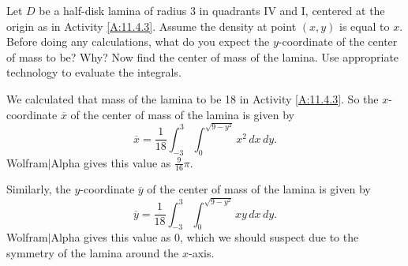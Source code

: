 \begin{activity} \label{A:11.4.5} Let $D$ be a half-disk lamina of radius 3 in quadrants IV and I, centered at the origin as in Activity \ref{A:11.4.3}.  Assume the density at point $(x,y)$ is equal to $x$. Before doing any calculations, what do you expect the $y$-coordinate of the center of mass to be? Why? Now find the center of mass of the lamina. Use appropriate technology to evaluate the integrals. 

\end{activity}
\begin{smallhint}

\end{smallhint}
\begin{bighint}

\end{bighint}
\begin{activitySolution}
We calculated that mass of the lamina to be 18 in Activity \ref{A:11.4.3}. So the $x$-coordinate $\overline{x}$ of the center of mass of the lamina is given by 
\[\overline{x} = \frac{1}{18} \int_{-3}^{3} \int_{0}^{\sqrt{9-y^2}} x^2 \, dx \, dy.\]
Wolfram$|$Alpha gives this value as $\frac{9}{16} \pi$. 

Similarly, the $y$-coordinate $\overline{y}$ of the center of mass of the lamina is given by  
\[\overline{y} = \frac{1}{18} \int_{-3}^{3} \int_{0}^{\sqrt{9-y^2}} xy \, dx \, dy.\]
Wolfram$|$Alpha gives this value as $0$, which we should suspect due to the symmetry of the lamina around the $x$-axis.  
\end{activitySolution}
\aftera